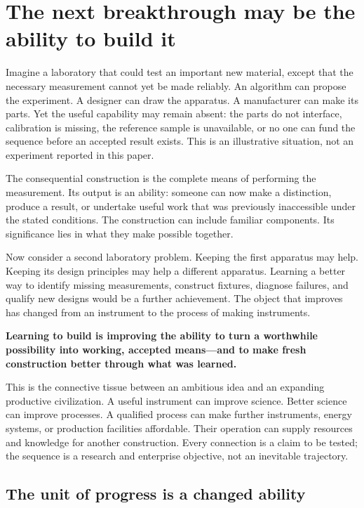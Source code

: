 \section{The next breakthrough may be the ability to build it}
\label{sec:opening}

Imagine a laboratory that could test an important new material, except that the necessary measurement cannot yet be made reliably. An algorithm can propose the experiment. A designer can draw the apparatus. A manufacturer can make its parts. Yet the useful capability may remain absent: the parts do not interface, calibration is missing, the reference sample is unavailable, or no one can fund the sequence before an accepted result exists. This is an illustrative situation, not an experiment reported in this paper.

The consequential construction is the complete means of performing the measurement. Its output is an ability: someone can now make a distinction, produce a result, or undertake useful work that was previously inaccessible under the stated conditions. The construction can include familiar components. Its significance lies in what they make possible together.

Now consider a second laboratory problem. Keeping the first apparatus may help. Keeping its design principles may help a different apparatus. Learning a better way to identify missing measurements, construct fixtures, diagnose failures, and qualify new designs would be a further achievement. The object that improves has changed from an instrument to the process of making instruments.

\begin{thesisbox}
\textbf{Learning to build is improving the ability to turn a worthwhile possibility into working, accepted means---and to make fresh construction better through what was learned.}
\end{thesisbox}

This is the connective tissue between an ambitious idea and an expanding productive civilization. A useful instrument can improve science. Better science can improve processes. A qualified process can make further instruments, energy systems, or production facilities affordable. Their operation can supply resources and knowledge for another construction. Every connection is a claim to be tested; the sequence is a research and enterprise objective, not an inevitable trajectory.

\subsection{The unit of progress is a changed ability}

